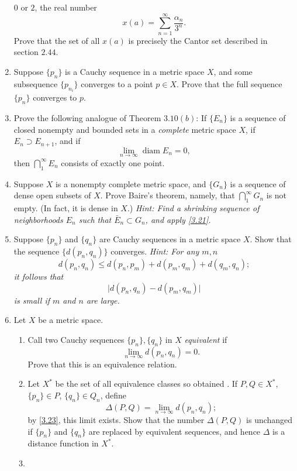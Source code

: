 \begin{enumerate}
  \(0\) or \(2\), the real number
  \[
  x(a) = \sum_{n = 1}^{\infty}\frac{\alpha_n}{3^n}.
  \]
  Prove that the set of all \(x(a)\) is precisely the Cantor set described in
  section \(2.44\).
\item
  Suppose \(\{p_n\}\) is a Cauchy sequence in a metric space \(X\), and some
  subsequence \(\{p_{n_i}\}\) converges to a point \(p\in X\).
  Prove that the full sequence \(\{p_n\}\) converges to \(p\).
\item
  \label{3.21}
  Prove the following analogue of Theorem \(3.10(b)\): If \(\{E_n\}\) is a
  sequence of closed nonempty and bounded sets in a \textit{complete} metric
  space \(X\), if \(E_n\supset E_{n + 1}\), and if
  \[
  \lim_{n\to\infty}\operatorname{diam} E_n = 0,
  \]
  then \(\bigcap_1^{\infty}E_n\) consists of exactly one point.
\item
  Suppose \(X\) is a nonempty complete metric space, and \(\{G_n\}\) is a
  sequence of dense open subsets of \(X\).
  Prove Baire's theorem, namely, that \(\bigcap_1^{\infty}G_n\) is not empty.
  (In fact, it is dense in \(X\).)
  \textit{Hint: Find a shrinking sequence of neighborhoods \(E_n\) such that
    \(\bar{E}_n\subset G_n\), and apply \cref{3.21}.}
\item
  \label{3.23}
  Suppose \(\{p_n\}\) and \(\{q_n\}\) are Cauchy sequences in a metric space
  \(X\).
  Show that the sequence \(\{d(p_n,q_n)\}\) converges.
  \textit{Hint: For any \(m,n\)
    \[
    d(p_n, q_n)\leq d(p_n, p_m) + d(p_m, q_m) + d(q_m, q_n);
    \]
    it follows that
    \[
    \lvert d(p_n, q_n) - d(p_m, q_m)\rvert
    \]
    is small if \(m\) and \(n\) are large.}
\item
  Let \(X\) be a metric space.
  \begin{enumerate}[label = (\alph*), ref = \theenumi{} (\alph*)]
  \item
    Call two Cauchy sequences \(\{p_n\},\{q_n\}\) in \(X\) \textit{equivalent}
    if
    \[
    \lim_{n\to\infty} d(p_n,q_n) = 0.
    \]
    Prove that this is an equivalence relation.
  \item
    Let \(X^*\) be the set of all equivalence classes so obtained .
    If \(P,Q\in X^*\), \(\{p_n\}\in P\),
    \(\{q_n\}\in Q_n\), define
    \[
    \Delta(P,Q) = \lim_{n\to\infty} d(p_n, q_n);
    \]
    by \cref{3.23}, this limit exists.
    Show that the number \(\Delta(P,Q)\) is unchanged if \(\{p_n\}\) and
    \(\{q_n\}\) are replaced by equivalent sequences, and hence \(\Delta\)
    is a distance function in \(X^*\).
  \item

\end{enumerate}
\end{enumerate}
